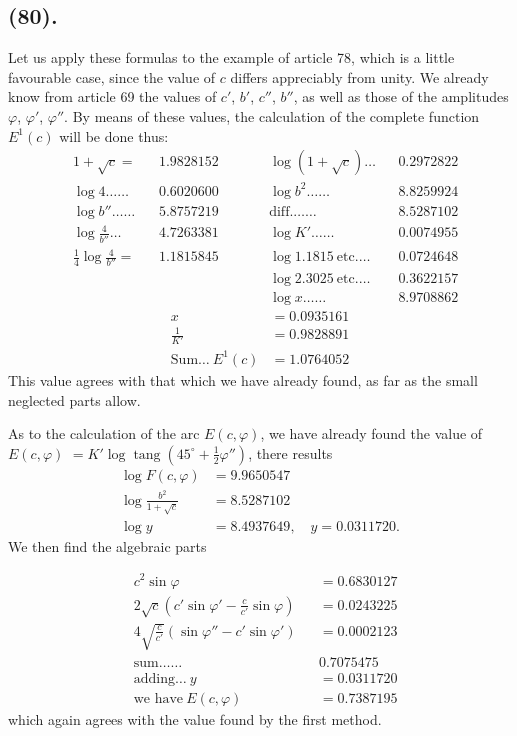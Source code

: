 \documentclass{article}
\begin{document}
\subsection*{(80).}

Let us apply these formulas to the example of article 78, which is a little favourable case, since the value of $c$ differs appreciably from unity. We already know from article 69 the values of $c'$, $b'$, $c''$, $b''$, as well as those of the amplitudes $\varphi$, $\varphi'$, $\varphi''$. By means of these values, the calculation of the complete function $E^{1}(c)$ will be done thus:
\[ \begin{aligned} &1+\sqrt{c}= && 1.9828152 &\qquad& \log(1+\sqrt{c})\ldots && 0.2972822\\ &\log 4\ldots\ldots && 0.6020600 && \log b^{2}\ldots\ldots && 8.8259924\\ &\log b''\ldots\ldots && 5.8757219 && \text{diff.}\ldots\ldots && 8.5287102\\ &\log\frac{4}{b''}\ldots && 4.7263381 && \log K'\ldots\ldots && 0.0074955\\ &\tfrac{1}{4}\log\frac{4}{b''}= && 1.1815845 && \log 1.1815\ \text{etc.}\ldots && 0.0724648\\ &&&&& \log 2.3025\ \text{etc.}\ldots && 0.3622157\\ &&&&& \log x\ldots\ldots && 8.9708862 \end{aligned} \]
\[ \begin{aligned} x&=0.0935161\\ \frac{1}{K'}&=0.9828891\\ \text{Sum}\ldots\ E^{1}(c)&=1.0764052 \end{aligned} \]
This value agrees with that which we have already found, as far as the small neglected parts allow.

As to the calculation of the arc $E(c,\varphi)$, we have already found the value of $E(c,\varphi)$ $=K'\log\operatorname{tang}(45^{\circ}+\frac{1}{2}\varphi'')$, there results
\[ \begin{aligned} \log F(c,\varphi)&=9.9650547\\ \log\frac{b^{2}}{1+\sqrt{c}}&=8.5287102\\ \log y&=8.4937649,\quad y=0.0311720. \end{aligned} \]
We then find the algebraic parts

\[ \begin{aligned} &c^{2}\sin\varphi && =0.6830127\\ &2\sqrt{c}\left(c'\sin\varphi'-\frac{c}{c'}\sin\varphi\right) && =0.0243225\\ &4\sqrt{\frac{c}{c'}}(\sin\varphi''-c'\sin\varphi') && =0.0002123\\ &\text{sum}\ldots\ldots && 0.7075475\\ &\text{adding}\ldots\ y && =0.0311720\\ &\text{we have}\ E(c,\varphi) && =0.7387195 \end{aligned} \]
which again agrees with the value found by the first method.
\end{document}
